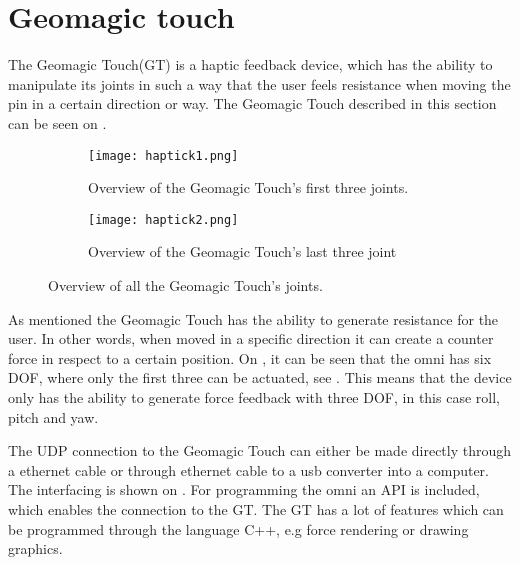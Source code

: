 \section{Geomagic touch}\label{sec:geo_magic}
The Geomagic Touch(GT) is a haptic feedback device, which has the ability to manipulate its joints in such a way that the user feels resistance when moving the pin in a certain direction or way. The Geomagic Touch described in this section can be seen on .

\begin{figure}[H]
	\centering
	\begin{subfigure}{.45\textwidth}
		\centering
		\texttt{[image: haptick1.png]}
		\caption{Overview of the Geomagic Touch's first three joints.}
		\label{fig:phantom1}
	\end{subfigure}
	\begin{subfigure}{.45\textwidth}
		\centering
		\texttt{[image: haptick2.png]}
		\caption{Overview of the Geomagic Touch's last three joint}
		\label{fig:phantom2}
	\end{subfigure}
\caption{Overview of all the Geomagic Touch's joints.}
\label{fig:phantom_omni}
\end{figure}

As mentioned the Geomagic Touch has the ability to generate resistance for the user. In other words, when moved in a specific direction it can create a counter force in respect to a certain position. On , it can be seen that the omni has six \gls{DOF}, where only the first three can be actuated, see . This means that the device only has the ability to generate force feedback with three \gls{DOF}, in this case roll, pitch and yaw.

The UDP connection to the Geomagic Touch can either be made directly through a ethernet cable or through ethernet cable to a usb converter into a computer. The interfacing is shown on . For programming the omni an API is included, which enables the connection to the GT. The GT has a lot of features which can be programmed through the language C++, e.g force rendering or drawing graphics.
